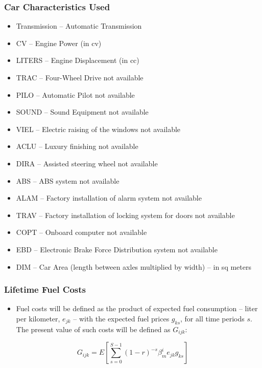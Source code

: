 \documentclass{beamer}
\begin{document}
\begin{frame}[fragile]\frametitle{Car Characteristics Used}

\tiny
\begin{itemize}
\item Transmission -- Automatic Transmission
\item CV -- Engine Power (in cv)
\item LITERS -- Engine Displacement (in cc)
\item TRAC -- Four-Wheel Drive not available
\item PILO -- Automatic Pilot not available
\item SOUND -- Sound Equipment not available
\item VIEL -- Electric raising of the windows not available
\item ACLU -- Luxury finishing not available
\item DIRA -- Assisted steering wheel not available
\item ABS -- ABS system not available
\item ALAM -- Factory installation of alarm system not available
\item TRAV -- Factory installation of locking system for doors not available
\item COPT -- Onboard computer not available
\item EBD -- Electronic Brake Force Distribution system not available
\item DIM -- Car Area (length between axles multiplied by width) -- in sq meters

\end{itemize}



\end{frame}

\begin{frame}[fragile]\frametitle{Lifetime Fuel Costs}

\begin{itemize}
    \item Fuel costs will be defined as the product of expected fuel consumption -- liter per kilometer, $e_{jk}$ -- with the expected fuel prices $g_{ks}$, for all time periods $s$. The present value of such costs will be defined as $G_{ijk}$:

\end{itemize}
    
\begin{equation*}
    G_{ijk}=E\left[\sum_{s=0}^{S-1} (1-r)^{-s} \beta_{m}^{i} e_{jk}g_{ks}       \right]
\end{equation*}



\end{frame}
\end{document}
